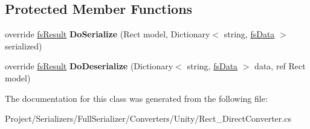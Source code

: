 \subsection*{Protected Member Functions}
\begin{DoxyCompactItemize}
\item 
\mbox{\label{class_full_serializer_1_1_internal_1_1_direct_converters_1_1_rect___direct_converter_a23a39057a3eca893d06cb2808b3c7747}} 
override \hyperlink{struct_full_serializer_1_1fs_result}{fs\+Result} {\bfseries Do\+Serialize} (Rect model, Dictionary$<$ string, \hyperlink{class_full_serializer_1_1fs_data}{fs\+Data} $>$ serialized)
\item 
\mbox{\label{class_full_serializer_1_1_internal_1_1_direct_converters_1_1_rect___direct_converter_a91f4f7c64ff15f6ff136e59cc9192263}} 
override \hyperlink{struct_full_serializer_1_1fs_result}{fs\+Result} {\bfseries Do\+Deserialize} (Dictionary$<$ string, \hyperlink{class_full_serializer_1_1fs_data}{fs\+Data} $>$ data, ref Rect model)
\end{DoxyCompactItemize}


The documentation for this class was generated from the following file\+:\begin{DoxyCompactItemize}
\item 
Project/\+Serializers/\+Full\+Serializer/\+Converters/\+Unity/Rect\+\_\+\+Direct\+Converter.\+cs\end{DoxyCompactItemize}
